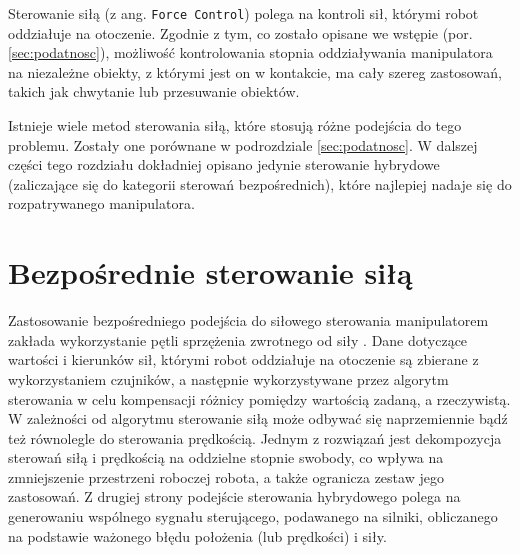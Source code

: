 \documentclass[printmode]{mgr}
\begin{document}
Sterowanie siłą (z ang. \texttt{Force Control}) polega na kontroli sił, którymi robot oddziałuje na otoczenie. Zgodnie z tym, 
co zostało opisane we wstępie (por. \ref{sec:podatnosc}), możliwość kontrolowania stopnia oddziaływania manipulatora na niezależne
obiekty, z którymi jest on w kontakcie, ma cały szereg zastosowań, takich jak chwytanie lub przesuwanie obiektów.

Istnieje wiele metod sterowania siłą, które stosują różne podejścia do tego problemu. Zostały one porównane w podrozdziale
\ref{sec:podatnosc}. W dalszej części tego rozdziału dokładniej opisano jedynie sterowanie hybrydowe
(zaliczające się do kategorii sterowań bezpośrednich), które najlepiej nadaje się do rozpatrywanego manipulatora.

\section{Bezpośrednie sterowanie siłą}
Zastosowanie bezpośredniego podejścia do siłowego sterowania manipulatorem zakłada wykorzystanie pętli sprzężenia zwrotnego od siły \cite{handbook}.
Dane dotyczące wartości i kierunków sił, którymi robot oddziałuje na otoczenie są zbierane z wykorzystaniem czujników, a następnie
wykorzystywane przez algorytm sterowania w celu kompensacji różnicy pomiędzy wartością zadaną, a rzeczywistą.
W zależności od algorytmu sterowanie siłą może odbywać się naprzemiennie bądź też równolegle do sterowania prędkością.
Jednym z rozwiązań jest dekompozycja sterowań siłą i prędkością na oddzielne stopnie swobody, co wpływa na zmniejszenie
przestrzeni roboczej robota, a także ogranicza zestaw jego zastosowań. Z drugiej strony podejście sterowania hybrydowego polega
na generowaniu wspólnego sygnału sterującego, podawanego na silniki, obliczanego na podstawie ważonego błędu położenia (lub prędkości) i siły.
\end{document}
